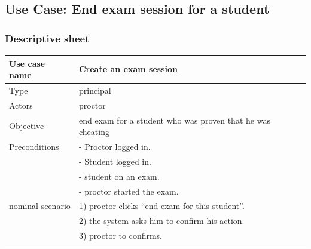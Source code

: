 \documentclass[]{uc2pfecaneva}
\begin{document}
\begin{table}[h]
	\raggedright\subsection{Use Case: End exam session for a student}
	\subsubsection{Descriptive sheet}
	\centering
	\begin{tabularx}{\textwidth}{|l|X|}
		\hline
		Use case name         & Create an exam session                                                                                                 \\ \hline
		Type                  & principal                                                                                                              \\ \hline
		Actors                & proctor                                                                                                                \\ \hline
		Objective             & end exam for a student who was proven that he was cheating                                                             \\ \hline
		Preconditions
		                      & - Proctor logged in.                                                                                                   \\
		                      & - Student logged in.                                                                                                   \\
		                      & - student on an exam.                                                                                                  \\
		                      & - proctor started the exam.                                                                                            \\ \hline
		nominal scenario
		                      & 1) proctor clicks “end exam for this student”.                                                                         \\
		                      & 2) the system asks him to confirm his action.                                                                          \\
		                      & 3) proctor to confirms.                                                                                                \\

\end{tabularx}
\end{table}
\end{document}
